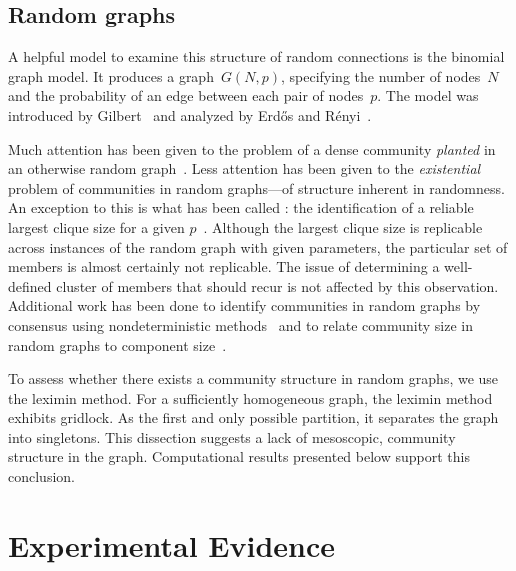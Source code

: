 \subsection{Random graphs}

A helpful model to examine this structure of random connections is the binomial graph model. It produces a graph~$G(N, p)$, specifying the number of nodes~$N$ and the probability of an edge between each pair of nodes~$p$. The model was introduced by Gilbert~\cite{gilbert1959random} and analyzed by Erd\H{o}s and R\'enyi~\cite{erdos1960evolution}. 

Much attention has been given to the problem of a dense community \emph{planted} in an otherwise random graph~\cite{hajek2015computational, arias2013community}. Less attention has been given to the \emph{existential} problem of communities in random graphs---of structure inherent in randomness. An exception to this is what has been called : the identification of a reliable largest clique size for a given $p$~\cite{matula1976largest, palmer1985graphical}. Although the largest clique size is replicable across instances of the random graph with given parameters, the particular set of members is almost certainly not replicable. The issue of determining a well-defined cluster of members that should recur is not affected by this observation. Additional work has been done to identify communities in random graphs by consensus using nondeterministic methods~\cite{campigotto2013power} and to relate community size in random graphs to component size~\cite{lipowski2014generic}.

To assess whether there exists a community structure in random graphs, we use the leximin method. For a sufficiently homogeneous graph, the leximin method exhibits gridlock. As the first and only possible partition, it separates the graph into singletons. This dissection suggests a lack of mesoscopic, community structure in the graph. Computational results presented below support this conclusion.





\section{Experimental Evidence} \label{sec:random_experiment}


